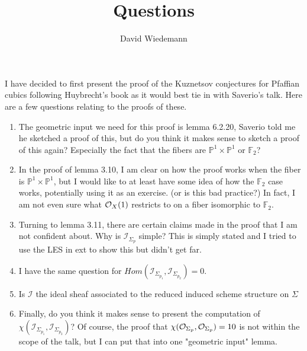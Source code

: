 

\title{Questions}
\author{David Wiedemann}
\date{}

\maketitle
I have decided to first present the proof of the Kuznetsov conjectures for Pfaffian cubics following Huybrecht's book as it would best tie in with Saverio's talk.
Here are a few questions relating to the proofs of these.
\begin{enumerate}
\item The geometric input we need for this proof is lemma 6.2.20, Saverio told me he sketched a proof of this, but do you think it makes sense to sketch a proof of this again? Especially the fact that the fibers are $\mathbb{P}^{1}\times \mathbb{P}^{1}$ or $\mathbb{F}_2$?
\item In the proof of lemma 3.10, I am clear on how the proof works when the fiber is $\mathbb{P}^{1}\times \mathbb{P}^{1}$, but I would like to at least have some idea of how the $\mathbb{F}_2$ case works, potentially using it as an exercise. (or is this bad practice?)
In fact, I am not even sure what $\mathcal{O}_X( 1) $ restricts to on a fiber isomorphic to $\mathbb{F}_2$.
\item Turning to lemma 3.11, there are certain claims made in the proof that I am not confident about.
	Why is $\mathcal{I}_{\Sigma_p} $ simple? This is simply stated and I tried to use the LES in ext to show this but didn't get far. 

\item I have the same question for $Hom( \mathcal{I}_{\Sigma_{p_1} } , \mathcal{I}_{\Sigma_{p_2} } ) = 0$.

\item Is $\mathcal{I}$ the ideal sheaf associated to the reduced induced scheme structure on $\Sigma$ 
\item Finally, do you think it makes sense to present the computation of $\chi( \mathcal{I}_{\Sigma_{p_1} } , \mathcal{I}_{\Sigma_{p_2} } ) $? Of course, the proof that $\chi( \mathcal{O}_{\Sigma_p} , \mathcal{O}_{\Sigma_p} ) = 10$ is not within the scope of the talk, but I can put that into one "geometric input" lemma.
\end{enumerate}


